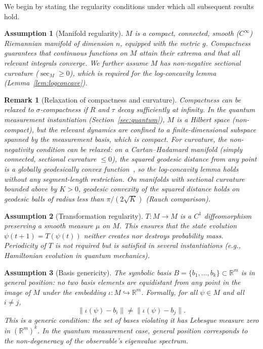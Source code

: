 \documentclass[11pt]{article}
\theoremstyle{plain}
\newtheorem{assumption}{Assumption}
\newtheorem{remark}{Remark}[section]
\begin{document}
We begin by stating the regularity conditions under which all subsequent results hold.

\begin{assumption}[Manifold regularity]\label{asm:manifold}
$M$ is a compact, connected, smooth ($C^\infty$) Riemannian manifold of dimension $n$, equipped
with the metric $g$. Compactness guarantees that continuous functions on $M$ attain their extrema
and that all relevant integrals converge. We further assume $M$ has non-negative sectional
curvature ($\sec_M \geq 0$), which is required for the log-concavity lemma
(Lemma~\ref{lem:logconcave}).
\end{assumption}

\begin{remark}[Relaxation of compactness and curvature]
Compactness can be relaxed to $\sigma$-compactness if $R$ and $\tau$ decay sufficiently at
infinity. In the quantum measurement instantiation (Section~\ref{sec:quantum}), $M$ is a Hilbert
space (non-compact), but the relevant dynamics are confined to a finite-dimensional subspace spanned
by the measurement basis, which is compact. For curvature, the non-negativity condition can be
relaxed: on a Cartan--Hadamard manifold (simply connected, sectional curvature $\leq 0$), the
squared geodesic distance from any point is a globally geodesically convex
function~\cite{petersen2016}, so the log-concavity lemma holds without any segment-length
restriction. On manifolds with sectional curvature bounded above by $K > 0$, geodesic convexity of
the squared distance holds on geodesic balls of radius less than $\pi/(2\sqrt{K})$ (Rauch
comparison).
\end{remark}

\begin{assumption}[Transformation regularity]\label{asm:transformation}
$T : M \to M$ is a $C^1$ diffeomorphism preserving a smooth measure $\mu$ on $M$. This ensures
that the state evolution $\psi(t+1) = T(\psi(t))$ neither creates nor destroys probability mass.
Periodicity of $T$ is not required but is satisfied in several instantiations (e.g., Hamiltonian
evolution in quantum mechanics).
\end{assumption}

\begin{assumption}[Basis genericity]\label{asm:genericity}
The symbolic basis $B = \{b_1, \ldots, b_k\} \subset \mathbb{R}^m$ is in general position: no two
basis elements are equidistant from any point in the image of $M$ under the embedding
$\iota : M \hookrightarrow \mathbb{R}^m$. Formally, for all $\psi \in M$ and all $i \neq j$,
\[
  \|\iota(\psi) - b_i\| \neq \|\iota(\psi) - b_j\|.
\]
This is a generic condition: the set of bases violating it has Lebesgue measure zero in
$(\mathbb{R}^m)^k$. In the quantum measurement case, general position corresponds to the
non-degeneracy of the observable's eigenvalue spectrum.
\end{assumption}
\end{document}
